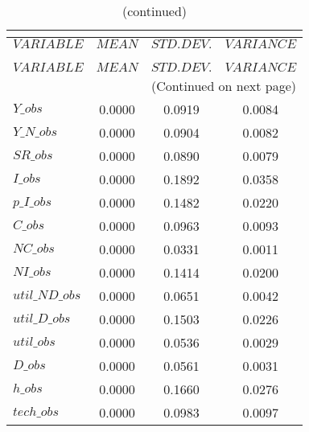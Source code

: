  
\begin{center}
\begin{longtable}{lccc} 
\caption{THEORETICAL MOMENTS}\\
 \label{Table:th_moments}\\
\toprule 
$VARIABLE       $	 & 	 $         MEAN$	 & 	 $    STD. DEV.$	 & 	 $     VARIANCE$\\
\midrule \endfirsthead 
\caption{(continued)}\\
 \toprule \\ 
$VARIABLE       $	 & 	 $         MEAN$	 & 	 $    STD. DEV.$	 & 	 $     VARIANCE$\\
\midrule \endhead 
\midrule \multicolumn{4}{r}{(Continued on next page)} \\ \bottomrule \endfoot 
\bottomrule \endlastfoot 
$Y\_obs         $	 & 	       0.0000	 & 	       0.0919	 & 	       0.0084 \\ 
$Y\_N\_obs      $	 & 	       0.0000	 & 	       0.0904	 & 	       0.0082 \\ 
$SR\_obs        $	 & 	       0.0000	 & 	       0.0890	 & 	       0.0079 \\ 
$I\_obs         $	 & 	       0.0000	 & 	       0.1892	 & 	       0.0358 \\ 
$p\_I\_obs      $	 & 	       0.0000	 & 	       0.1482	 & 	       0.0220 \\ 
$C\_obs         $	 & 	       0.0000	 & 	       0.0963	 & 	       0.0093 \\ 
$NC\_obs        $	 & 	       0.0000	 & 	       0.0331	 & 	       0.0011 \\ 
$NI\_obs        $	 & 	       0.0000	 & 	       0.1414	 & 	       0.0200 \\ 
$util\_ND\_obs  $	 & 	       0.0000	 & 	       0.0651	 & 	       0.0042 \\ 
$util\_D\_obs   $	 & 	       0.0000	 & 	       0.1503	 & 	       0.0226 \\ 
$util\_obs      $	 & 	       0.0000	 & 	       0.0536	 & 	       0.0029 \\ 
$D\_obs         $	 & 	       0.0000	 & 	       0.0561	 & 	       0.0031 \\ 
$h\_obs         $	 & 	       0.0000	 & 	       0.1660	 & 	       0.0276 \\ 
$tech\_obs      $	 & 	       0.0000	 & 	       0.0983	 & 	       0.0097 \\ 
\end{longtable}
 \end{center}

